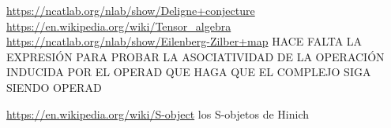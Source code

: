 \documentclass[TFM.tex]{subfiles}
\begin{document}


\url{https://ncatlab.org/nlab/show/Deligne+conjecture}
\url{https://en.wikipedia.org/wiki/Tensor_algebra}
\url{https://ncatlab.org/nlab/show/Eilenberg-Zilber+map} HACE FALTA LA EXPRESIÓN PARA PROBAR LA ASOCIATIVIDAD DE LA OPERACIÓN INDUCIDA POR EL OPERAD QUE HAGA QUE EL COMPLEJO SIGA SIENDO OPERAD

\url{https://en.wikipedia.org/wiki/S-object} los S-objetos de Hinich
\end{document}
